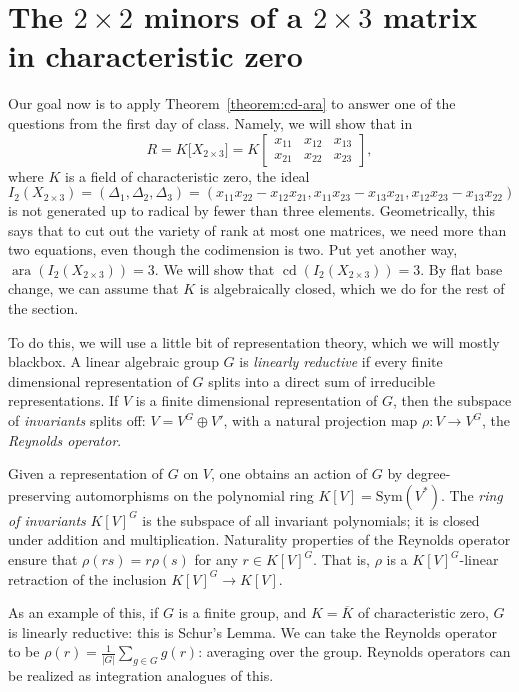 \documentclass[11pt]{book}
\numberwithin{equation}{section}
\numberwithin{theorem}{chapter}
\theoremstyle{definition}
\newtheorem*{basic properties}{Basic Properties}
\newtheorem*{Important Remark}{Important Remark}
\theoremstyle{remark}
\newcommand{\ara}{\operatorname{ara}}
\DeclareMathOperator{\cd}{cd}
\begin{document}
\section{The $2\times 2$ minors of a $2\times 3$ matrix in characteristic zero}

Our goal now is to apply Theorem~\ref{theorem:cd-ara} to answer one of the questions from the first day of class. Namely, we will show that in 
\[R = K\big[X_{2\times 3}\big] =\displaystyle K \begin{bmatrix} x_{11} & x_{12} & x_{13} \\ x_{21} & x_{22} & x_{23} \end{bmatrix}, \]
where $K$ is a field of characteristic zero, the ideal
\[I_2(X_{2\times 3}) = (\Delta_1, \Delta_2, \Delta_3) = (x_{11}x_{22}-x_{12}x_{21},x_{11}x_{23}-x_{13}x_{21},x_{12}x_{23}-x_{13}x_{22}) \]
is not generated up to radical by fewer than three elements. Geometrically, this says that to cut out the variety of rank at most one matrices, we need more than two equations, even though the codimension is two. Put yet another way, $\ara(I_2(X_{2\times 3}))=3$. We will show that $\cd(I_2(X_{2\times 3}))=3$. By flat base change, we can assume that $K$ is algebraically closed, which we do for the rest of the section.

To do this, we will use a little bit of representation theory, which we will mostly blackbox. A linear algebraic group $G$ is \emph{linearly reductive} if every finite dimensional representation of $G$ splits into a direct sum of irreducible representations. If $V$ is a finite dimensional representation of $G$, then the subspace of \emph{invariants} splits off: $V=V^G\oplus V'$, with a natural projection map $\rho:V\to V^G$, the \emph{Reynolds operator}.

Given a representation of $G$ on $V$, one obtains an action of $G$ by degree-preserving automorphisms on the polynomial ring $K[V]=\mathrm{Sym}(V^*)$. The \emph{ring of invariants} $K[V]^G$ is the subspace of all invariant polynomials; it is closed under addition and multiplication. Naturality properties of the Reynolds operator ensure that $\rho(rs)=r \rho(s)$ for any $r\in K[V]^G$. That is, $\rho$ is a $K[V]^G$-linear retraction of the inclusion $K[V]^G \to K[V]$.

As an example of this, if $G$ is a finite group, and $K=\overline{K}$ of characteristic zero, $G$ is linearly reductive: this is Schur's Lemma. We can take the Reynolds operator to be $\rho(r)=\frac{1}{|G|} \sum_{g\in G} g(r)$: averaging over the group. Reynolds operators can be realized as integration analogues of this.
\end{document}

